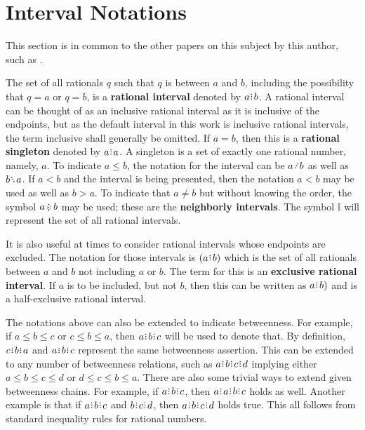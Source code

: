 \documentclass[12pt]{article}
\begin{document}
\section{Interval Notations}

This section is in common to the other papers on this subject by this author, such as \cite{taylor24dedekind}.

The set of all rationals $q$ such that $q$ is between $a$ and $b$, including the possibility that $q=a$ or $q=b$, is a \textbf{rational interval} denoted by $a\rint b$. A rational interval can be thought of as an inclusive rational interval as it is inclusive of the endpoints, but as the default interval in this work is inclusive rational intervals, the term inclusive shall generally be omitted.  If $a=b$, then this is a \textbf{rational singleton} denoted by $a\rint a$. A singleton is a set of exactly one rational number, namely, $a$. To indicate $a \leq b$, the notation for the interval can be $a \lte b$ as well as $b \gte a$. If $a < b$ and the interval is being presented, then the notation $a \lt b$ may be used as well as $b \gt a$. To indicate that $a \neq b$ but without knowing the order, the symbol $a \betneq b$ may be used; these are the \textbf{neighborly intervals}. The symbol $\mathbb{I}$ will represent the set of all rational intervals. 

It is also useful at times to consider rational intervals whose endpoints are excluded. The notation for those intervals is $(a \rint b)$ which is the set of all rationals between $a$ and $b$ not including $a$ or $b$. The term for this is an \textbf{exclusive rational interval}. If $a$ is to be included, but not $b$, then this can be written as $a\rint b)$ and is a half-exclusive rational interval. 

The notations above can also be extended to indicate betweenness. For example, if $a \leq b \leq c$ or $c \leq b \leq a$, then $a\rint b\rint c$ will be used to denote that. By definition, $c\rint b\rint a$ and $a\rint b\rint c$ represent the same betweenness assertion. This can be extended to any number of betweenness relations, such as $a\rint b\rint c\rint d$ implying either $a \leq b \leq c \leq d$ or $d \leq c \leq b \leq a$. There are also some trivial ways to extend given betweenness chains. For example, if $a\rint b\rint c$, then $a\rint a\rint b\rint c$ holds as well. Another example is that if $a\rint b\rint c$ and $b\rint c\rint d$, then $a\rint b\rint c\rint d$ holds true. This all follows from standard inequality rules for rational numbers. 
\end{document}
